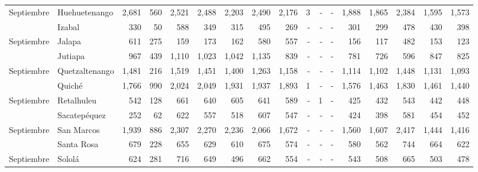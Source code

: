 \begin{landscape}
\begin{center}
\begin{longtable}{llrrrrrrrrrrrrrrr}
			\multicolumn{1}{l}{	\footnotesize	 Septiembre 	}&	 Huehuetenango 	&	 2,681 	&	 560 	&	 2,521 	&	 2,488 	&	 2,203 	&	 2,490 	&	 2,176 	&	 3 	&	 -   	&	 -   	&	 1,888 	&	 1,865 	&	 2,384 	&	 1,595 	&	 1,573 	\\
			\rowcolor{color1!5!white}\multicolumn{1}{l}{	\footnotesize	 Septiembre 	}&	 Izabal 	&	 330 	&	 50 	&	 588 	&	 349 	&	 315 	&	 495 	&	 269 	&	 -   	&	 -   	&	 -   	&	 301 	&	 299 	&	 478 	&	 430 	&	 398 	\\
			\multicolumn{1}{l}{	\footnotesize	 Septiembre 	}&	 Jalapa 	&	 611 	&	 275 	&	 159 	&	 173 	&	 162 	&	 580 	&	 557 	&	 -   	&	 -   	&	 -   	&	 156 	&	 117 	&	 482 	&	 153 	&	 123 	\\
			\rowcolor{color1!5!white}\multicolumn{1}{l}{	\footnotesize	 Septiembre 	}&	 Jutiapa 	&	 967 	&	 439 	&	 1,110 	&	 1,023 	&	 1,042 	&	 1,135 	&	 839 	&	 -   	&	 -   	&	 -   	&	 781 	&	 726 	&	 596 	&	 847 	&	 825 	\\
			\multicolumn{1}{l}{	\footnotesize	 Septiembre 	}&	 Quetzaltenango 	&	 1,481 	&	 216 	&	 1,519 	&	 1,451 	&	 1,400 	&	 1,263 	&	 1,158 	&	 -   	&	 -   	&	 -   	&	 1,114 	&	 1,102 	&	 1,448 	&	 1,131 	&	 1,093 	\\
			\rowcolor{color1!5!white}\multicolumn{1}{l}{	\footnotesize	 Septiembre 	}&	 Quiché 	&	 1,766 	&	 990 	&	 2,024 	&	 2,049 	&	 1,931 	&	 1,937 	&	 1,893 	&	 1 	&	 -   	&	 -   	&	 1,576 	&	 1,463 	&	 1,830 	&	 1,461 	&	 1,440 	\\
			\multicolumn{1}{l}{	\footnotesize	 Septiembre 	}&	 Retalhuleu 	&	 542 	&	 128 	&	 661 	&	 640 	&	 605 	&	 641 	&	 589 	&	 -   	&	 1 	&	 -   	&	 425 	&	 432 	&	 543 	&	 442 	&	 448 	\\
			\rowcolor{color1!5!white}\multicolumn{1}{l}{	\footnotesize	 Septiembre 	}&	 Sacatepéquez 	&	 252 	&	 62 	&	 622 	&	 557 	&	 518 	&	 607 	&	 547 	&	 -   	&	 -   	&	 -   	&	 424 	&	 398 	&	 581 	&	 454 	&	 452 	\\
			\multicolumn{1}{l}{	\footnotesize	 Septiembre 	}&	 San Marcos 	&	 1,939 	&	 886 	&	 2,307 	&	 2,270 	&	 2,236 	&	 2,066 	&	 1,672 	&	 -   	&	 -   	&	 -   	&	 1,560 	&	 1,607 	&	 2,417 	&	 1,444 	&	 1,416 	\\
			\rowcolor{color1!5!white}\multicolumn{1}{l}{	\footnotesize	 Septiembre 	}&	 Santa Rosa 	&	 679 	&	 228 	&	 655 	&	 629 	&	 610 	&	 675 	&	 574 	&	 -   	&	 -   	&	 -   	&	 580 	&	 562 	&	 744 	&	 664 	&	 622 	\\
			\multicolumn{1}{l}{	\footnotesize	 Septiembre 	}&	 Sololá 	&	 624 	&	 281 	&	 716 	&	 649 	&	 496 	&	 662 	&	 554 	&	 -   	&	 -   	&	 -   	&	 543 	&	 508 	&	 665 	&	 503 	&	 478 	\\

\end{longtable}
\end{center}
\end{landscape}
